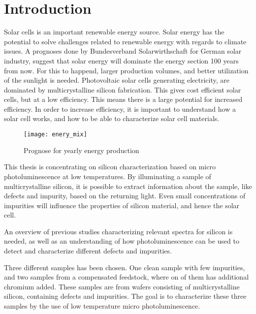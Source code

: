 \section{Introduction}

Solar cells is an important renewable energy source. Solar energy has the potential to solve challenges related to renewable energy with regards to climate issues. A prognoses done by Bundesverband Solarwirthschaft for German solar industry, suggest that solar energy will dominate the energy section 100 years from now. For this to happend, larger production volumes, and better utilization of the sunlight is needed. Photovoltaic solar cells generating electricity, are dominated by multicrystalline silicon fabrication. This gives cost efficient solar cells, but at a low efficiency. This means there is a large potential for increased efficiency. In order to increase efficiency, it is important to understand how a solar cell works, and how to be able to characterize solar cell materials.

\begin{figure}[H]
\texttt{[image: enery\_mix]}%
\caption{Prognose for yearly energy production}%
\label{fig:energimix}%
\end{figure}

This thesis is concentrating on silicon characterization based on micro photoluminescence at low temperatures. By illuminating a sample of multicrystalline silicon, it is possible to extract information about the sample, like defects and impurity, based on the returning light. Even small concentrations of impurities will influence the properties of silicon material, and hence the solar cell. 

An overview of previous studies characterizing relevant spectra for silicon is needed, as well as an understanding of how photoluminescence can be used to detect and characterize different defects and impurities. 

Three different samples has been chosen. One clean sample with few impurities, and two samples from a compensated feedstock, where on of them has additional chromium added. These samples are from wafers consisting of multicrystalline silicon, containing defects and impurities. The goal is to characterize these three samples by the use of low temperature micro photoluminescence.